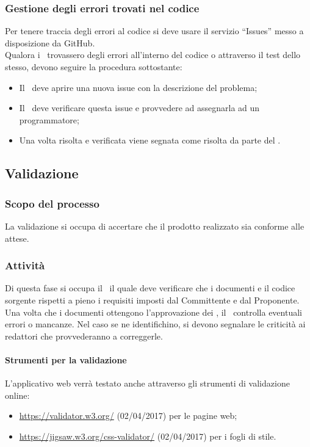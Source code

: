 \documentclass[../NormeDiProgetto.tex]{subfiles}
\begin{document}
				\subsubsection{Gestione degli errori trovati nel codice\\}\label{GestioneErroriCodice}
					Per tenere traccia degli errori al codice si deve usare il servizio ``Issues'' messo a
					disposizione da GitHub.\\
					Qualora i \verificatori\ trovassero degli errori all'interno del codice o attraverso il
					test dello stesso, devono seguire la procedura sottostante:
					\begin{itemize}
						\item Il \verificatore\ deve aprire una nuova issue con la descrizione
						del problema;
						\item Il \responsabilediprogetto\ deve verificare questa issue e provvedere ad
						assegnarla ad un programmatore;
						\item Una volta risolta e verificata viene segnata come risolta da parte
						del \responsabilediprogetto.
					\end{itemize}
				
				
		\subsection{Validazione}
			\subsubsection{Scopo del processo}
				La validazione si occupa di accertare che il prodotto realizzato sia conforme
				alle attese.
			\subsubsection{Attività}
				Di questa fase si occupa il \responsabilediprogetto\ il quale deve verificare
				che i documenti e il codice sorgente rispetti a pieno i requisiti imposti dal
				Committente e dal Proponente.\\
				Una volta che i	documenti ottengono l'approvazione dei \verificatori, il
				\responsabilediprogetto\ controlla eventuali errori o mancanze.
				Nel caso se ne identifichino, si devono segnalare le criticità ai
				redattori che provvederanno a correggerle.
				\paragraph{Strumenti per la validazione }
					L'applicativo web verrà testato anche attraverso gli strumenti di validazione online:
					\begin{itemize}
						\item \url{https://validator.w3.org/} (02/04/2017) per le pagine web;
						\item \url{https://jigsaw.w3.org/css-validator/} (02/04/2017) per i fogli di stile.
					\end{itemize}
\end{document}
